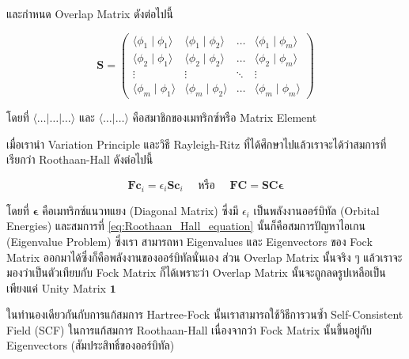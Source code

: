 \noindent และกำหนด Overlap Matrix ดังต่อไปนี้

\begin{equation}
    \mathbf{S}
    =
    \left(
    \begin{array}{cccc}
            \langle\phi_1 \mid \phi_1\rangle & \langle\phi_1 \mid \phi_2\rangle &
            \ldots                           & \langle\phi_1 \mid \phi_m\rangle                   \\
            \langle\phi_2 \mid \phi_1\rangle & \langle\phi_2 \mid \phi_2\rangle &
            \ldots                           & \langle\phi_2 \mid \phi_m\rangle                   \\
            \vdots                           & \vdots                           & \ddots & \vdots \\
            \langle\phi_m \mid \phi_1\rangle & \langle\phi_m \mid \phi_2\rangle &
            \ldots                           & \langle\phi_m \mid \phi_m\rangle
        \end{array}
    \right)
\end{equation}

\noindent โดยที่ $\langle \dots | \dots | \dots \rangle$ และ $\langle \dots | \dots \rangle$
คือสมาชิกของเมทริกซ์หรือ Matrix Element

เมื่อเรานำ Variation Principle และวิธี Rayleigh-Ritz ที่ได้ศึกษาไปแล้วเราจะได้ว่าสมการที่เรียกว่า Roothaan-Hall ดังต่อไปนี้

\begin{equation}
    \label{eq:Roothaan_Hall_equation}
    \mathbf{F c}_i
    =
    \epsilon_i \mathbf{S c}_i \quad
    \text{ หรือ } \quad
    \mathbf{FC} = \mathbf{S C} \boldsymbol{\epsilon}
\end{equation}

\noindent โดยที่ $\boldsymbol{\epsilon}$ คือเมทริกซ์แนวทแยง (Diagonal Matrix) ซึ่งมี $\epsilon_i$ เป็นพลังงานออร์บิทัล
(Orbital Energies) และสมการที่ \ref{eq:Roothaan_Hall_equation} นั้นก็คือสมการปัญหาไอเกน (Eigenvalue Problem) ซึ่งเรา%
สามารถหา Eigenvalues และ Eigenvectors ของ Fock Matrix ออกมาได้ซึ่งก็คือพลังงานของออร์บิทัลนั่นเอง ส่วน Overlap Matrix
นั้นจริง ๆ แล้วเราจะมองว่าเป็นตัวเทียบกับ Fock Matrix ก็ได้เพราะว่า Overlap Matrix นั้นจะถูกลดรูปเหลือเป็นเพียงแค่ Unity Matrix
$\mathbf{1}$

ในทำนองเดียวกันกับการแก้สมการ Hartree-Fock นั้นเราสามารถใช้วิธีการวนซ้ำ Self-Consistent Field (SCF) ในการแก้สมการ
Roothaan-Hall เนื่องจากว่า Fock Matrix นั้นขึ้นอยู่กับ Eigenvectors (สัมประสิทธิ์ของออร์บิทัล)

